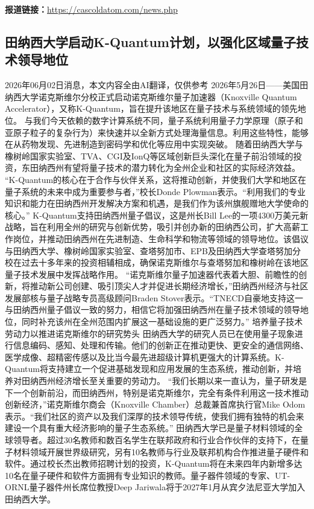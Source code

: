 \documentclass[12pt,a4paper]{ctexart}
\begin{document}
\noindent\textbf{报道链接：}\url{https://cascoldatom.com/news.php}

\subsection{ 田纳西大学启动K-Quantum计划，以强化区域量子技术领导地位 }

2026年06月02日消息，本文内容全由AI翻译，仅供参考
2026年5月26日——美国田纳西大学诺克斯维尔分校正式启动诺克斯维尔量子加速器（Knoxville Quantum Accelerator），又称K-Quantum，旨在提升该地区在量子技术与系统领域的领先地位。
与我们今天依赖的数字计算系统不同，量子系统利用量子力学原理（原子和亚原子粒子的复杂行为）来快速并以全新方式处理海量信息。利用这些特性，能够在从药物发现、先进制造到密码学和优化等应用中实现突破。
随着田纳西大学与橡树岭国家实验室、TVA、CGI及IonQ等区域创新巨头深化在量子前沿领域的投资，东田纳西州有望将量子技术的潜力转化为全州企业和社区的实际经济效益。
“K-Quantum的核心在于合作与伙伴关系，这将推动创新，并使我们大学和地区在量子系统的未来中成为重要参与者，”校长Donde Plowman表示。“利用我们的专业知识和能力在田纳西州开发解决方案和机遇，是我们作为该州旗舰赠地大学使命的核心。”
K-Quantum支持田纳西州量子倡议，这是州长Bill Lee的一项4300万美元新战略，旨在利用全州的研究与创新优势，吸引并创办新的田纳西公司，扩大高薪工作岗位，并推动田纳西州在先进制造、生命科学和物流等领域的领导地位。该倡议与田纳西大学、橡树岭国家实验室、查塔努加市、EPB及田纳西大学查塔努加分校在过去十多年来的投资相辅相成，确保诺克斯维尔与查塔努加和橡树岭在该地区量子技术发展中发挥战略作用。
“诺克斯维尔量子加速器代表着大胆、前瞻性的创新，将推动新公司创建、吸引顶尖人才并促进长期经济增长，”田纳西州经济与社区发展部核与量子战略专员高级顾问Braden Stover表示。“TNECD自豪地支持这一与田纳西州量子倡议一致的努力，相信它将加强田纳西州在量子技术领域的领导地位，同时补充该州在全州范围内扩展这一基础设施的更广泛努力。”
培养量子技术劳动力以推进诺克斯维尔的研究势头
田纳西大学的研究人员已在使用量子现象进行信息编码、感知、处理和传输。他们的创新正在推动更快、更安全的通信网络、医学成像、超精密传感以及比当今最先进超级计算机更强大的计算系统。K-Quantum将支持建立一个促进基础发现和应用发展的生态系统，推动创新，并培养对田纳西州经济增长至关重要的劳动力。
“我们长期以来一直认为，量子研发是下一个创新前沿，而田纳西州，特别是诺克斯维尔，完全有条件利用这一技术推动创新经济，”诺克斯维尔商会（Knoxville Chamber）总裁兼首席执行官Mike Odom表示。“我们社区的资产以及我们深厚的技术领导传统，使我们拥有独特的机会来建设一个具有重大经济影响的量子生态系统。”
田纳西大学已是量子材料领域的全球领导者。超过30名教师和数百名学生在联邦政府和行业合作伙伴的支持下，在量子材料领域开展世界级研究，另有10名教师与行业及联邦机构合作推进量子硬件和软件。通过校长杰出教师招聘计划的投资，K-Quantum将在未来四年内新增多达10名在量子硬件和软件方面拥有专业知识的教师。量子器件领域的专家、UT-ORNL量子器件州长席位教授Deep Jariwala将于2027年1月从宾夕法尼亚大学加入田纳西大学。
\end{document}
